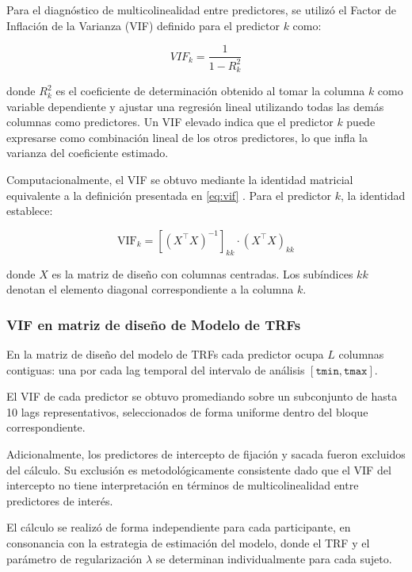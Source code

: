 Para el diagnóstico de multicolinealidad entre predictores, se utilizó el Factor de Inflación de la Varianza (VIF) \citep{kutner1984applied, marquardt1970generalized}
 definido para el predictor $k$ como:

\begin{equation}
    \label{eq:vif}
    VIF_{k} = \frac{1}{1-R_k^2}
\end{equation}

\noindent donde $R_k^2$ es el coeficiente de determinación obtenido al tomar la columna $k$ como variable dependiente y ajustar una regresión lineal utilizando todas las demás columnas como predictores. Un VIF elevado indica que el predictor $k$ puede expresarse como combinación lineal de los otros predictores, lo que infla la varianza del coeficiente estimado.

Computacionalmente, el VIF se obtuvo mediante la identidad matricial equivalente a la definición presentada en \eqref{eq:vif} \citep{taboga2021vif}. Para el predictor $k$, la identidad establece:

\begin{equation}
    \label{eq:vif_identidad}
    \text{VIF}_k = \left[(X^\top X)^{-1}\right]_{kk} \cdot \left(X^\top X\right)_{kk}
\end{equation}

\noindent donde $X$ es la matriz de diseño con columnas centradas. Los subíndices $kk$ denotan el elemento diagonal correspondiente a la columna $k$. 

\subsubsection{VIF en matriz de diseño de Modelo de TRFs}
\label{subsec:vif}

En la matriz de diseño del modelo de TRFs cada predictor ocupa $L$ columnas contiguas: una por cada lag temporal del intervalo de análisis $[\texttt{tmin}, \texttt{tmax}]$.

El VIF de cada predictor se obtuvo promediando sobre un subconjunto de hasta 10 lags representativos, seleccionados de forma uniforme dentro del bloque correspondiente.

Adicionalmente, los predictores de intercepto de fijación y sacada fueron excluidos
del cálculo. Su exclusión es
metodológicamente consistente dado que el VIF del intercepto no tiene interpretación
en términos de multicolinealidad entre predictores de interés.

El cálculo se realizó de forma independiente para cada participante, en consonancia con la estrategia de estimación del modelo, donde el TRF y el 
parámetro de regularización $\lambda$ se determinan individualmente para cada 
sujeto. 

